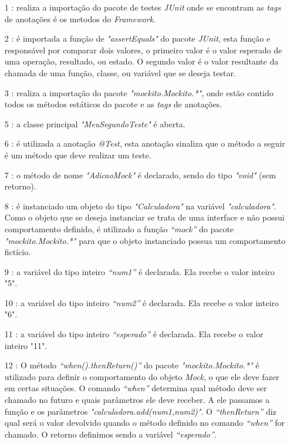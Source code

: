 \begin{itemize}

\item[1]: realiza a importação do pacote de testes \textit{JUnit} onde se encontram as \textit{tags} de anotações é os metodos do \textit{Framework}. 

\item[2]:  é importada a função de \textit{"assertEquals"} do pacote \textit{JUnit}, esta função e responsável por comparar dois valores, o primeiro valor é o valor esperado de uma operação, resultado, ou estado. O segundo valor é o valor resultante da chamada de uma função, classe, ou variável que se deseja testar. 

\item[3]: realiza a importação do pacote \textit{"mockito.Mockito.*"}, onde estão contido todos os métodos estáticos do pacote e as \textit{tags} de anotações. 


\item[5]: a classe principal \textit{"MeuSegundoTeste"} é aberta. 

\item[6]: é utilizada a anotação \textit{@Test}, esta anotação sinaliza que o método a seguir é um método que deve realizar um teste. 

\item[7]: o método de nome \textit{"AdicaoMock"} é declarado, sendo do tipo \textit{"void"} (sem retorno). 


\item[8]: é instanciado um objeto do tipo \textit{"Calculadora"} na variável \textit{"calculadora"}. Como o objeto que se deseja instanciar se trata de uma interface e não possui comportamento definido, é utilizado a função \textit{“mock”} do pacote \textit{"mockito.Mockito.*"} para que o objeto instanciado possua um comportamento fictício. 

\item[9]: a variável do tipo inteiro \textit{“num1”} é declarada. Ela recebe o valor inteiro "5". 

\item[10]: a variável do tipo inteiro \textit{“num2”} é declarada. Ela recebe o valor inteiro "6".

\item[11]: a variável do tipo inteiro \textit{“esperado”} é declarada. Ela recebe o valor inteiro "11". 

\item[12]: O método \textit{“when().thenReturn()”} do pacote \textit{"mockito.Mockito.*"}  é utilizado para definir o comportamento do objeto \textit{Mock}, o que ele deve fazer em certas situações.
O comando \textit{“when”}  determina qual método deve ser chamado no futuro e quais parâmetros ele deve receber. A ele passamos a função e os parâmetros \textit{"calculadora.add(num1,num2)"}. O \textit{“thenReturn”} diz qual será o valor devolvido quando o método definido no comando \textit{“when”} for chamado. O retorno definimos sendo a variável \textit{“esperado”}.



\end{itemize}
